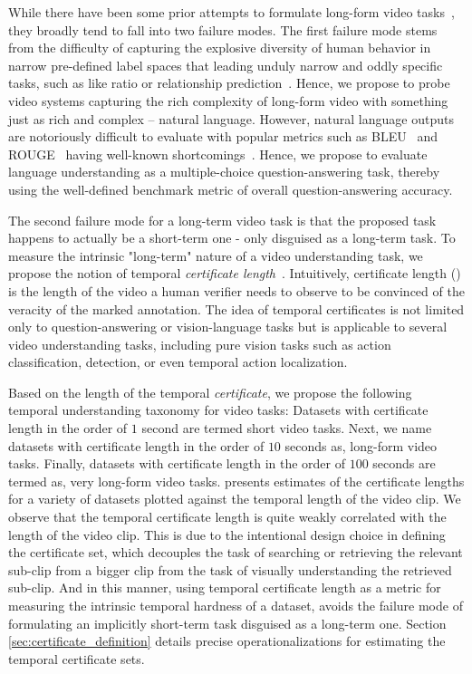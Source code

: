 While there have been some prior attempts to formulate long-form video tasks~\cite{lvu, mad}, they broadly tend to fall into two failure modes. The first failure mode stems from the difficulty of capturing the explosive diversity of human behavior in narrow pre-defined label spaces that leading unduly narrow and oddly specific tasks, such as like ratio or relationship prediction~\cite{lvu}. Hence, we propose to probe video systems capturing the rich complexity of long-form video with something just as rich and complex -- natural language. However, natural language outputs are notoriously difficult to evaluate with popular metrics such as BLEU~\cite{bleu} and ROUGE~\cite{rouge} having well-known shortcomings~\cite{bleu_role}. Hence, we propose to evaluate language understanding as a multiple-choice question-answering task, thereby using the well-defined benchmark metric of overall question-answering accuracy.

The second failure mode for a long-term video task is that the proposed task happens to actually be a short-term one - only disguised as a long-term task. To measure the intrinsic "long-term" nature of a video understanding task, we propose the notion of temporal \textit{certificate length}~\cite{complexitytheory}. Intuitively, certificate length () is the length of the video a human verifier needs to observe to be convinced of the veracity of the marked annotation. The idea of temporal certificates is not limited only to question-answering or vision-language tasks but is applicable to several video understanding tasks, including pure vision tasks such as action classification, detection, or even temporal action localization. 

Based on the length of the temporal \textit{certificate}, we propose the following  temporal understanding taxonomy for video tasks: Datasets with certificate length in the order of $1$ second are termed short video tasks. Next, we name datasets with certificate length in the order of $10$ seconds as, long-form video tasks. Finally, datasets with certificate length in the order of $100$ seconds are termed as, very long-form video tasks.  presents estimates of the certificate lengths for a variety of datasets plotted against the temporal length of the video clip. We observe that the temporal certificate length is quite weakly correlated with the length of the video clip. This is due to the intentional design choice in defining the certificate set, which decouples the task of searching or retrieving the relevant sub-clip from a bigger clip from the task of visually understanding the retrieved sub-clip. And in this manner, using temporal certificate length as a metric for measuring the intrinsic temporal hardness of a dataset, avoids the failure mode of formulating an implicitly short-term task disguised as a long-term one. Section \ref{sec:certificate_definition} details precise operationalizations for estimating the temporal certificate sets.  

